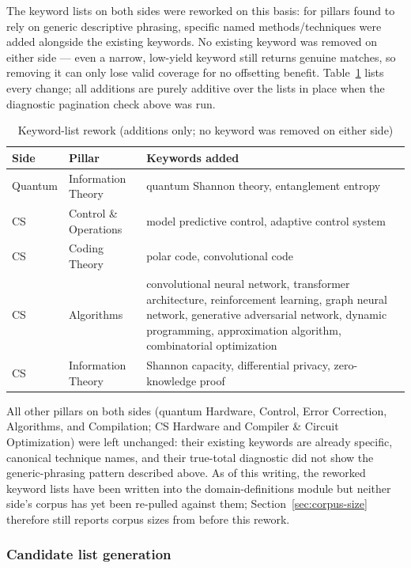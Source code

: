 \documentclass[11pt]{article}
\begin{document}
The keyword lists on both sides were reworked on this basis: for pillars found to rely
on generic descriptive phrasing, specific named methods/techniques were added
alongside the existing keywords. No existing keyword was removed on either side ---
even a narrow, low-yield keyword still returns genuine matches, so removing it can only
lose valid coverage for no offsetting benefit. Table~\ref{tab:keyword-rework} lists
every change; all additions are purely additive over the lists in place when the
diagnostic pagination check above was run.

\begin{table}[htbp]
\centering
\caption{Keyword-list rework (additions only; no keyword was removed on either side)}
\label{tab:keyword-rework}
\begin{tabular}{@{}l l p{7.3cm}@{}}
\toprule
Side & Pillar & Keywords added \\
\midrule
Quantum & Information Theory & quantum Shannon theory, entanglement entropy \\
CS & Control \& Operations & model predictive control, adaptive control system \\
CS & Coding Theory & polar code, convolutional code \\
CS & Algorithms & convolutional neural network, transformer architecture, reinforcement
learning, graph neural network, generative adversarial network, dynamic programming,
approximation algorithm, combinatorial optimization \\
CS & Information Theory & Shannon capacity, differential privacy, zero-knowledge proof \\
\bottomrule
\end{tabular}
\end{table}

All other pillars on both sides (quantum Hardware, Control, Error Correction,
Algorithms, and Compilation; CS Hardware and Compiler \& Circuit Optimization) were
left unchanged: their existing keywords are already specific, canonical technique
names, and their true-total diagnostic did not show the generic-phrasing pattern
described above. As of this writing, the reworked keyword lists have been written into
the domain-definitions module but neither side's corpus has yet been re-pulled against
them; Section~\ref{sec:corpus-size} therefore still reports corpus sizes from before
this rework.

\subsubsection{Candidate list generation}
\label{sec:candidate-list-gen}
\end{document}
